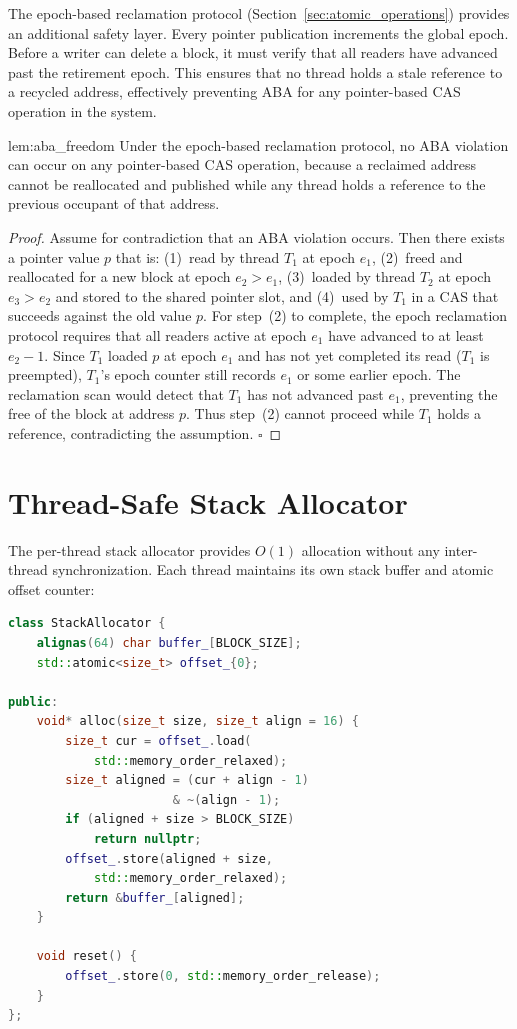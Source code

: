 The epoch-based reclamation protocol (Section~\ref{sec:atomic_operations}) provides an additional safety layer. Every pointer publication increments the global epoch. Before a writer can delete a block, it must verify that all readers have advanced past the retirement epoch. This ensures that no thread holds a stale reference to a recycled address, effectively preventing ABA for any pointer-based CAS operation in the system.

\begin{mylemma}{lem:aba_freedom}
Under the epoch-based reclamation protocol, no ABA violation can occur on any pointer-based CAS operation, because a reclaimed address cannot be reallocated and published while any thread holds a reference to the previous occupant of that address.
\end{mylemma}

\begin{proof}
Assume for contradiction that an ABA violation occurs. Then there exists a pointer value $p$ that is: (1)~read by thread $T_1$ at epoch $e_1$, (2)~freed and reallocated for a new block at epoch $e_2 > e_1$, (3)~loaded by thread $T_2$ at epoch $e_3 > e_2$ and stored to the shared pointer slot, and (4)~used by $T_1$ in a CAS that succeeds against the old value $p$. For step~(2) to complete, the epoch reclamation protocol requires that all readers active at epoch $e_1$ have advanced to at least $e_2 - 1$. Since $T_1$ loaded $p$ at epoch $e_1$ and has not yet completed its read ($T_1$ is preempted), $T_1$'s epoch counter still records $e_1$ or some earlier epoch. The reclamation scan would detect that $T_1$ has not advanced past $e_1$, preventing the free of the block at address $p$. Thus step~(2) cannot proceed while $T_1$ holds a reference, contradicting the assumption. $\square$
\end{proof}

\section{Thread-Safe Stack Allocator}
\label{sec:stack_allocator}

The per-thread stack allocator provides $O(1)$ allocation without any inter-thread synchronization. Each thread maintains its own stack buffer and atomic offset counter:

\begin{lstlisting}[language=C++,caption={Thread-local stack allocator}]
class StackAllocator {
    alignas(64) char buffer_[BLOCK_SIZE];
    std::atomic<size_t> offset_{0};

public:
    void* alloc(size_t size, size_t align = 16) {
        size_t cur = offset_.load(
            std::memory_order_relaxed);
        size_t aligned = (cur + align - 1)
                       & ~(align - 1);
        if (aligned + size > BLOCK_SIZE)
            return nullptr;
        offset_.store(aligned + size,
            std::memory_order_relaxed);
        return &buffer_[aligned];
    }

    void reset() {
        offset_.store(0, std::memory_order_release);
    }
};
\end{lstlisting}

